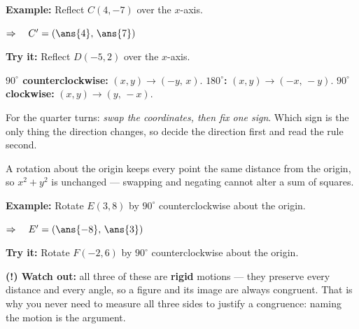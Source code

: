 \documentclass[12pt]{article}
\begin{document}
\begin{examplebox}
\textbf{Example:} \quad Reflect $C(4, -7)$ over the $x$-axis.

$\Rightarrow\quad C' = (\ans{4},\, \ans{7})$
\end{examplebox}

\begin{tryitbox}
\textbf{Try it:} \quad Reflect $D(-5, 2)$ over the $x$-axis.\\[2pt]
\end{tryitbox}


\begin{formulabox}
\textbf{$90^\circ$ counterclockwise:} $(x, y) \rightarrow (-y,\, x)$. \quad
\textbf{$180^\circ$:} $(x, y) \rightarrow (-x,\, -y)$. \quad
\textbf{$90^\circ$ clockwise:} $(x, y) \rightarrow (y,\, -x)$.\par
\smallskip
For the quarter turns: \emph{swap the coordinates, then fix one sign}. Which sign is the
only thing the direction changes, so decide the direction first and read the rule second.
\par
\smallskip
A rotation about the origin keeps every point the same distance from the origin, so
$x^2 + y^2$ is unchanged --- swapping and negating cannot alter a sum of squares.
\end{formulabox}

\begin{examplebox}
\textbf{Example:} \quad Rotate $E(3, 8)$ by $90^\circ$ counterclockwise about the origin.

$\Rightarrow\quad E' = (\ans{-8},\, \ans{3})$
\end{examplebox}

\begin{tryitbox}
\textbf{Try it:} \quad Rotate $F(-2, 6)$ by $90^\circ$ counterclockwise about the origin.\\[2pt]
\end{tryitbox}

\begin{watchoutbox}
\textbf{(!) Watch out:} all three of these are \textbf{rigid} motions --- they preserve
every distance and every angle, so a figure and its image are always congruent. That is
why you never need to measure all three sides to justify a congruence: naming the motion
is the argument.
\end{watchoutbox}
\end{document}
